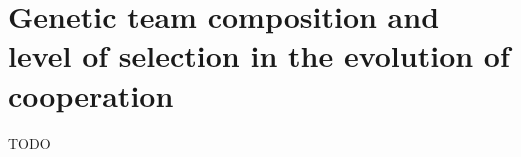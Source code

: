\section{Genetic team composition and level of selection in the evolution of cooperation \cite{waibel2009genetic}}

\begin{frame}{TODO}

\end{frame}
